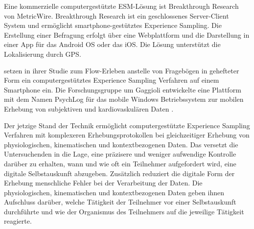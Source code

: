 Eine kommerzielle computergestützte \ac{ESM}-Lösung ist Breakthrough Research von MetricWire. Breakthrough Research ist ein geschlossenes Server-Client System und ermöglicht smartphone-gestütztes Experience Sampling. Die Erstellung einer Befragung erfolgt über eine Webplattform und die Darstellung in einer App für das Android OS oder das iOS. Die Lösung unterstützt die Lokalisierung durch \acs{GPS}.

\citet{Gaggioli2013} setzen in ihrer Studie zum Flow-Erleben anstelle von Fragebögen in gehefteter Form ein computergestütztes Experience Sampling Verfahren auf einem Smartphone ein. Die Forschungsgruppe um Gaggioli entwickelte eine Plattform mit dem Namen PsychLog für das mobile Windows Betriebssystem zur mobilen Erhebung von subjektiven und kardiovaskulären Daten \citep{Gaggioli2013a}.

Der jetzige Stand der Technik ermöglicht computergestützte Experience Sampling Verfahren mit komplexeren Erhebungsprotokollen bei gleichzeitiger Erhebung von physiologischen, kinematischen und kontextbezogenen Daten. Das versetzt die Untersuchenden in die Lage, eine präzisere und weniger aufwendige Kontrolle darüber zu erhalten, wann und wie oft ein Teilnehmer aufgefordert wird, eine digitale Selbstauskunft abzugeben. Zusätzlich reduziert die digitale Form der Erhebung menschliche Fehler bei der Verarbeitung der Daten. Die physiologischen, kinematischen und kontextbezogenen Daten geben ihnen Aufschluss darüber, welche Tätigkeit der Teilnehmer vor einer Selbstauskunft durchführte und wie der Organismus des Teilnehmers auf die jeweilige Tätigkeit reagierte.


